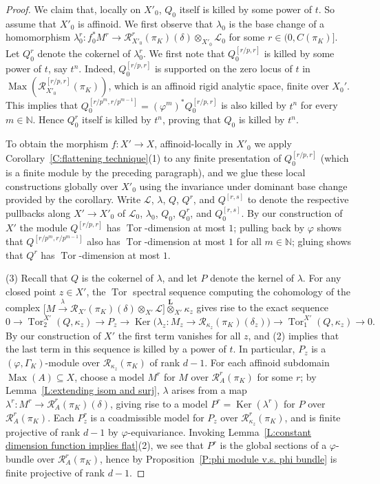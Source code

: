\documentclass[12pt]{article}
\theoremstyle{definition}
\numberwithin{equation}{theorem}
\newcommand{\calL}{\mathcal{L}}
\newcommand{\calR}{\mathcal{R}}
\newcommand{\NN}{\mathbb{N}}
\newcommand{\bbL}{\mathbf{L}}
\DeclareMathOperator{\Ker}{Ker}
\DeclareMathOperator{\Max}{Max}
\DeclareMathOperator{\Tor}{Tor}
\begin{document}
\begin{proof}
We claim that, locally on $X'_0$, $Q_0$ itself is killed by some power of $t$.  So assume that $X'_0$ is affinoid.  We first observe that $\lambda_0$ is the base change of a homomorphism $\lambda_0^r: f_0^*M^r \to \calR_{X'_0}^r(\pi_K)(\delta) \otimes_{X'_0} \calL_0$ for some $r \in (0, C(\pi_K)]$.  Let $Q_0^r$ denote the cokernel of $\lambda_0^r$.  We first note that $Q_0^{[r/p,r]}$ is killed by some power of $t$, say $t^n$.  Indeed, $Q_0^{[r/p,r]}$ is supported on the zero locus of $t$ in $\Max(\calR_{X'_0}^{[r/p,r]}(\pi_K))$, which is an affinoid rigid analytic space, finite over $X_0'$.  This implies that $Q_0^{[r/p^m, r/p^{m-1}]} = (\varphi^m)^*Q_0^{[r/p,r]}$ is also killed by $t^n$ for every $m \in \NN$.  Hence $Q_0^r$ itself is killed by $t^n$, proving that $Q_0$ is killed by $t^n$.

To obtain the morphism $f: X' \to X$, affinoid-locally in $X'_0$ we apply Corollary~\ref{C:flattening technique}(1) to any finite presentation of $Q_0^{[r/p,r]}$ (which is a finite module by the preceding paragraph), and we glue these local constructions globally over $X'_0$ using the invariance under dominant base change provided by the corollary.  Write $\calL$, $\lambda$, $Q$, $Q^r$, and $Q^{[r,s]}$ to denote the respective pullbacks along $X' \to X'_0$ of $\calL_0$, $\lambda_0$, $Q_0$, $Q_0^r$, and $Q_0^{[r,s]}$.  By our construction of $X'$ the module $Q^{[r/p,r]}$ has $\Tor$-dimension at most $1$; pulling back by $\varphi$ shows that $Q^{[r/p^m,r/p^{m-1}]}$ also has $\Tor$-dimension at most $1$ for all $m \in \NN$; gluing shows that $Q^r$ has $\Tor$-dimension at most $1$.

(3) Recall that $Q$ is the cokernel of $\lambda$, and let $P$ denote the kernel of $\lambda$.  For any closed point $z \in X'$,  the $\Tor$ spectral sequence computing the cohomology of the complex $\big[M \xrightarrow\lambda \calR_{X'}(\pi_K)(\delta) \otimes_{X'} \calL\big] \stackrel{\bbL}\otimes_{X'} \kappa_z$ gives rise to the exact sequence
\[
0 \to \Tor_2^{X'}(Q,\kappa_z) \to P_z \to \Ker\big( \lambda_z: M_z \to \calR_{\kappa_z}(\pi_K)(\delta_z)\big) \to \Tor_1^{X'}(Q, \kappa_z) \to 0.
\]
By our construction of $X'$ the first term vanishes for all $z$, and
(2) implies that the last term in this sequence is killed by a power
of $t$.  In particular, $P_z$ is a $(\varphi,\Gamma_K)$-module over
$\calR_{\kappa_z}(\pi_K)$ of rank $d-1$.  For each affinoid subdomain
$\Max(A) \subseteq X$, choose a model $M^r$ for $M$ over
$\calR_A^r(\pi_K)$ for some $r$; by Lemma~\ref{L:extending isom and
  surj}, $\lambda$ arises from a map $\lambda^r: M^r \to
\calR_A^r(\pi_K)(\delta)$, giving rise to a model $P^r =
\Ker(\lambda^r)$ for $P$ over $\calR_A^r(\pi_K)$.  Each $P^r_z$ is a
coadmissible model for $P_z$ over $\calR_{\kappa_z}^r(\pi_K)$, and is
finite projective of rank $d-1$ by $\varphi$-equivariance.  Invoking
Lemma~\ref{L:constant dimension function implies flat}(2), we see that
$P^r$ is the global sections of a $\varphi$-bundle over
$\calR_A^r(\pi_K)$, hence by Proposition~\ref{P:phi module v.s. phi
  bundle} is finite projective of rank $d-1$.
\end{proof}
\end{document}

